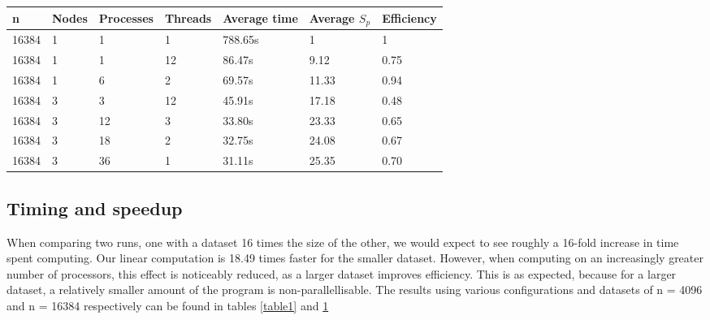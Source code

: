 \begin{table}[h]
   \centering
    \begin{tabular}{| l | l | l | l | l | l | l |}
    \hline
    \bf{n} & \bf{Nodes} & \bf{Processes} &\bf{Threads} & \bf{Average time} & \bf{Average }$S_{p}$ & \bf{Efficiency} \\ \hline
    	16384 & 1 & 1 & 1 & 788.65s & 1 & 1 \\ \hline
	16384 & 1 & 1 & 12 & 86.47s & 9.12 & 0.75 \\ \hline
	16384 & 1 & 6 & 2 & 69.57s & 11.33 & 0.94 \\ \hline
	16384 & 3 & 3 & 12 & 45.91s & 17.18 & 0.48 \\ \hline
	16384 & 3 & 12 & 3 & 33.80s & 23.33 & 0.65 \\ \hline
	16384 & 3 & 18 & 2 & 32.75s & 24.08 & 0.67 \\ \hline	
	16384 & 3 & 36 & 1 & 31.11s & 25.35 & 0.70  \\ \hline
    \end{tabular}
	\label{table2}
\end{table}



\subsection{Timing and speedup}
When comparing two runs, one with a dataset 16 times the size of the other, we would expect to see roughly a 16-fold increase in time spent computing. Our linear computation is 18.49 times faster for the smaller dataset. However, when computing on an increasingly greater number of processors, this effect is noticeably reduced, as a larger dataset improves efficiency. This is as expected, because for a larger dataset, a relatively smaller amount of the program is non-parallellisable. The results using various configurations and datasets of n = 4096 and n = 16384 respectively can be found in tables \ref{table1} and \ref{table2}
